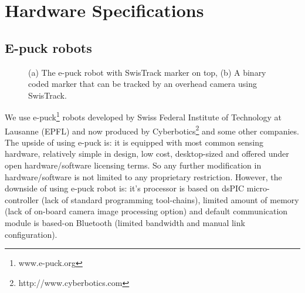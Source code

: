 \appendix
\appendixpage
\addappheadtotoc
\chapter{Hardware Specifications}
\section{E-puck robots}
\begin{figure}[htp]
\centering
{} 
\hspace{0.5cm}
\caption{(a) The e-puck robot with SwisTrack marker on top, (b) A binary coded marker that can be tracked by an overhead camera  using SwisTrack.}
\label{fig:e-puck}
\end{figure}
We use e-puck\footnote{www.e-puck.org} robots developed by Swiss Federal Institute of Technology at Lausanne (EPFL) and now produced by Cyberbotics\footnote{http://www.cyberbotics.com} and some other companies. The upside of using e-puck is: it is equipped with most common sensing hardware, relatively simple in design, low cost, desktop-sized and offered under open hardware/software licensing terms. So any further modification in hardware/software is not limited to any proprietary restriction. However, the downside of using e-puck robot is: it's processor is based on dsPIC micro-controller (lack of standard programming tool-chains), limited amount of memory (lack of on-board camera image processing option) and default communication module is based-on Bluetooth (limited bandwidth and manual link configuration).

